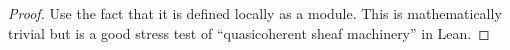 \begin{proof}
	Use the fact that it is defined locally
	as a module.
	This is mathematically trivial but 
	is a good stress test of 
	``quasicoherent sheaf machinery''
	in Lean.
\end{proof}

%
%

%
%
%
%
%
%
%
%
%
%

